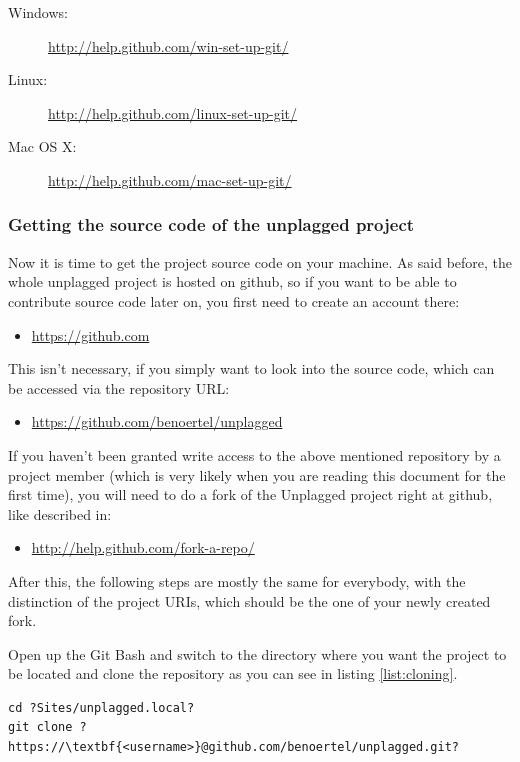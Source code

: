 \begin{description}
\item[Windows:] \url{http://help.github.com/win-set-up-git/}
\item[Linux:] \url{http://help.github.com/linux-set-up-git/}
\item[Mac OS X:] \url{http://help.github.com/mac-set-up-git/}
\end{description}

\subsubsection{Getting the source code of the unplagged project}
Now it is time to get the project source code on your machine. As said before, the whole unplagged project is hosted 
on 
github, so if you want to be able to contribute source code later on, you first need to create an account there:

\begin{itemize} 
\item \url{https://github.com}
\end{itemize}

This isn't necessary, if you simply want to look into the source code, which can be accessed via the repository URL:

\begin{itemize}
\item \url{https://github.com/benoertel/unplagged}
\end{itemize}

If you haven't been granted write access to the above mentioned repository by a project member (which is very likely 
when
you are reading this document for the first time), you will need to do a fork
of the Unplagged project right at github, like described in:

\begin{itemize}
\item \url{http://help.github.com/fork-a-repo/}
\end{itemize}

After this, the following steps are mostly the same for everybody, with the distinction of the project URIs, 
which should be the one of your newly created fork.

Open up the Git Bash and switch to the directory where you want the project to be 
located and clone the repository as you can see in listing \ref{list:cloning}. 

\begin{lstlisting}[caption=Cloning a repository, label=list:cloning]
cd ?Sites/unplagged.local?
git clone ?https://\textbf{<username>}@github.com/benoertel/unplagged.git?
\end{lstlisting}

